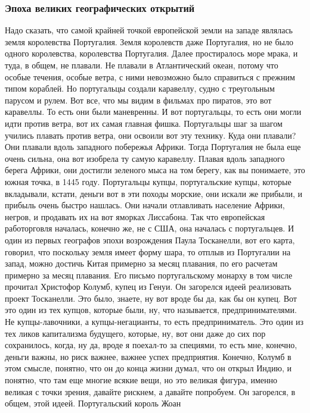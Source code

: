 \subsubsection{Эпоха великих географических открытий} 
Надо сказать, что самой крайней
точкой европейской земли на западе являлась земля королевства Португалия. Земля
королевств даже Португалия, но не было одного королевства, королевства
Португалия. Далее простиралось море мрака, и туда, в общем, не плавали. Не
плавали в Атлантический океан, потому что особые течения, особые ветра, с ними
невозможно было справиться с прежним типом кораблей. Но португальцы создали
каравеллу, судно с треугольным парусом и рулем. Вот все, что мы видим в фильмах
про пиратов, это вот каравеллы. То есть они были маневренны. И вот португальцы,
то есть они могли идти против ветра, вот их самая главная фишка. Португальцы шаг
за шагом учились плавать против ветра, они освоили вот эту технику. Куда они
плавали? Они плавали вдоль западного побережья Африки. Тогда Португалия не была
еще очень сильна, она вот изобрела ту самую каравеллу. Плавая вдоль западного
берега Африки, они достигли зеленого мыса на том берегу, как вы понимаете, это
южная точка, в 1445 году. Португальцы купцы, португальские купцы, которые
вкладывали, кстати, деньги вот в эти походы морские, они искали же прибыли, и
прибыль очень быстро нашлась. Они начали отлавливать население Африки, негров, и
продавать их на вот яморках Лиссабона. Так что европейская работорговля
началась, конечно же, не с США, она началась с португальцев. И один из первых
географов эпохи возрождения Паула Тосканелли, вот его карта, говорил, что
поскольку земля имеет форму шара, то отплыв из Португалии на запад, можно
достичь Китая примерно за месяц плавания, по его расчетам примерно за месяц
плавания. Его письмо португальскому монарху в том числе прочитал Христофор
Колумб, купец из Генуи. Он загорелся идеей реализовать проект Тосканелли. Это
было, знаете, ну вот вроде бы да, как бы он купец. Вот это один из тех купцов,
которые были, ну, что называется, предпринимателями. Не купцы-лавочники, а
купцы-негацианты, то есть предприниматель. Это один из тех ликов капитализма
будущего, которые, ну, вот они даже до сих пор сохранилось, когда, ну да, вроде
я поехал-то за специями, то есть мне, конечно, деньги важны, но риск важнее,
важнее успех предприятия. Конечно, Колумб в этом смысле, понятно, что он до
конца жизни думал, что он открыл Индию, и понятно, что там еще многие всякие
вещи, но это великая фигура, именно великая с точки зрения, давайте рискнем, а
давайте попробуем. Он загорелся, в общем, этой идеей. Португальский король Жоан
